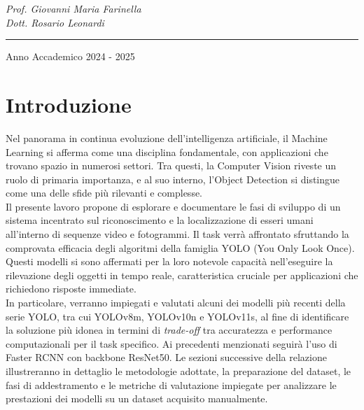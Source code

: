 \documentclass[12pt]{article}
\begin{document}
\begin{titlepage}
\bigskip


\bigskip


\bigskip


\bigskip



\bigskip


\bigskip


\bigskip

{\raggedleft
\it
Prof. Giovanni Maria Farinella \\
Dott. Rosario Leonardi 
\par}


\bigskip


\bigskip


\bigskip


\bigskip

\hrule

\bigskip

{\centering
Anno Accademico 2024 - 2025
\par}
\end{titlepage}


\renewcommand{\contentsname}{Indice}
\tableofcontents  %
\newpage
\section{Introduzione}
Nel panorama in continua evoluzione dell'intelligenza artificiale, il Machine Learning si afferma come una disciplina fondamentale, con applicazioni che trovano spazio in numerosi settori. Tra questi, la Computer Vision riveste un ruolo di primaria importanza, e al suo interno, l'Object Detection si distingue come una delle sfide più rilevanti e complesse. \\
Il presente lavoro propone di esplorare e documentare le fasi di sviluppo di un sistema incentrato sul riconoscimento e la localizzazione di esseri umani all'interno di sequenze video e fotogrammi. Il task verrà affrontato sfruttando la comprovata efficacia degli algoritmi della famiglia YOLO (You Only Look Once). Questi modelli si sono affermati per la loro notevole capacità nell'eseguire la rilevazione degli oggetti in tempo reale, caratteristica cruciale per applicazioni che richiedono risposte immediate. \\
In particolare, verranno impiegati e valutati alcuni dei modelli più recenti della serie YOLO, tra cui YOLOv8m, YOLOv10n e YOLOv11s, al fine di identificare la soluzione più idonea in termini di \textit{trade-off} tra accuratezza e performance computazionali per il task specifico. Ai precedenti menzionati seguirà l'uso di Faster RCNN con backbone ResNet50. Le sezioni successive della relazione illustreranno in dettaglio le metodologie adottate, la preparazione del dataset, le fasi di addestramento e le metriche di valutazione impiegate per analizzare le prestazioni dei modelli su un dataset acquisito manualmente. 
\end{document}
